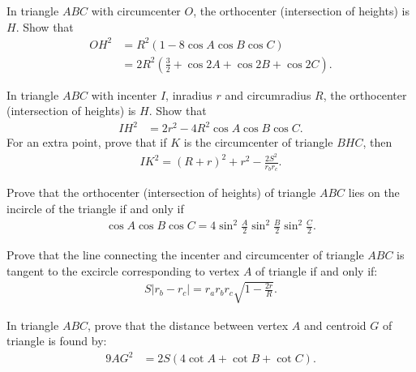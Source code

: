     \begin{question}[name=Distance Between Circumcenter and Orthocenter]
        In triangle $ABC$ with circumcenter $O$, the orthocenter (intersection of heights) is $H$. Show that
        \begin{align*}
            OH^2 &= R^2(1-8\cos A \cos B \cos C)\\
            &= 2R^2\left(\frac{3}{2} + \cos 2A + \cos 2B + \cos 2C\right).
        \end{align*}
    \end{question}





    \begin{question}[name=Distance Between Incenter and Orthocenter]
        In triangle $ABC$ with incenter $I$, inradius $r$ and circumradius $R$, the orthocenter (intersection of heights) is $H$. Show that
        \begin{align*}
            IH^2 &= 2r^2 - 4R^2\cos A \cos B \cos C.
        \end{align*}
        For an extra point, prove that if $K$ is the circumcenter of triangle $BHC$, then
        \begin{align*}
            IK^2 = (R+r)^2 + r^2 - \frac{2S^2}{r_br_c}.
        \end{align*}
    \end{question}

\begin{question}
    Prove that the orthocenter (intersection of heights) of triangle $ABC$ lies on the incircle of the triangle if and only if
    \begin{align*}
        \cos A \cos B \cos C = 4\sin^2\frac{A}{2}\sin^2\frac{B}{2}\sin^2\frac{C}{2}.
    \end{align*}
\end{question}

\begin{question}
    Prove that the line connecting the incenter and circumcenter of triangle $ABC$ is tangent to the excircle corresponding to vertex $A$ of triangle if and only if:
    \begin{align*}
        S\left|r_b-r_c\right| = r_ar_br_c\sqrt{1-\frac{2r}{R}}.
    \end{align*}
\end{question}

    \begin{question}[name=Distance Between Vertex and Centroid]
        In triangle $ABC$, prove that the distance between vertex $A$ and centroid $G$ of triangle is found by:
        \begin{align*}
            9AG^2 &= 2S(4\cot A + \cot B + \cot C).
        \end{align*}
    \end{question}



